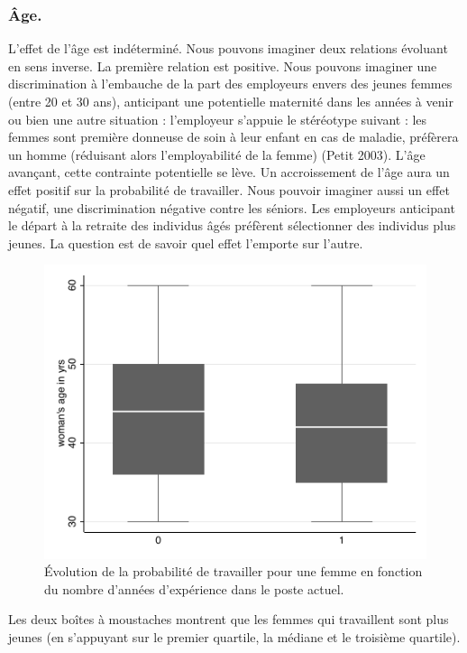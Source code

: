 \subsubsection*{Âge.}

L’effet de l’âge est indéterminé. Nous pouvons imaginer deux relations évoluant en sens inverse. La première relation est positive. Nous pouvons imaginer une discrimination à l’embauche de la part des employeurs envers des jeunes femmes (entre 20 et 30 ans), anticipant une potentielle maternité dans les années à venir ou bien une autre situation : l’employeur s’appuie le stéréotype suivant : les femmes sont première donneuse de soin à leur enfant en cas de maladie, préfèrera un homme (réduisant alors l’employabilité de la femme) (Petit 2003). L’âge avançant, cette contrainte potentielle se lève. Un accroissement de l’âge aura un effet positif sur la probabilité de travailler. Nous pouvoir imaginer aussi un effet négatif, une discrimination négative contre les séniors. Les employeurs anticipant le départ à la retraite des individus âgés préfèrent sélectionner des individus plus jeunes. La question est de savoir quel effet l’emporte sur l’autre.

\begin{figure}[h]
    \caption{Évolution de la probabilité de travailler pour une femme en fonction du nombre d'années d'expérience dans le poste actuel.}
    \includegraphics{101_graphics/boxplot.pdf}
    \centering
\end{figure}

Les deux boîtes à moustaches montrent que les femmes qui travaillent sont plus jeunes (en s'appuyant sur le premier quartile, la médiane et le troisième quartile).

